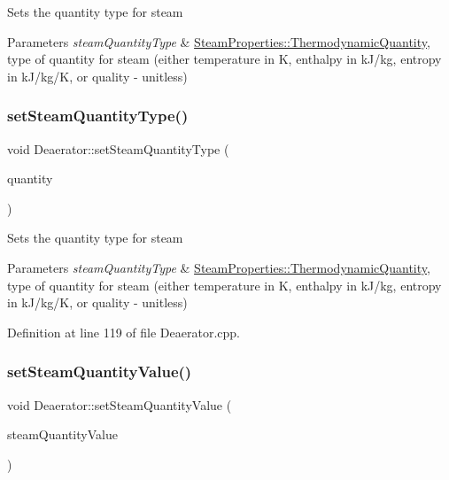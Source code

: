 Sets the quantity type for steam 
\begin{DoxyParams}{Parameters}
{\em steam\+Quantity\+Type} & \hyperlink{class_steam_properties_ae0294bedf7d178c2d8fb6aed0f62fbff}{Steam\+Properties\+::\+Thermodynamic\+Quantity}, type of quantity for steam (either temperature in K, enthalpy in k\+J/kg, entropy in k\+J/kg/K, or quality -\/ unitless) \\
\hline
\end{DoxyParams}
\mbox{\label{class_deaerator_a1aa3b3de064d148479af9576e717b6c2}} 
\subsubsection{\texorpdfstring{set\+Steam\+Quantity\+Type()}{setSteamQuantityType()}\hspace{0.1cm}{\footnotesize\ttfamily [3/3]}}
{\footnotesize\ttfamily void Deaerator\+::set\+Steam\+Quantity\+Type (\begin{DoxyParamCaption}\item[{\hyperlink{class_steam_properties_ae0294bedf7d178c2d8fb6aed0f62fbff}{Steam\+Properties\+::\+Thermodynamic\+Quantity}}]{quantity }\end{DoxyParamCaption})}

Sets the quantity type for steam 
\begin{DoxyParams}{Parameters}
{\em steam\+Quantity\+Type} & \hyperlink{class_steam_properties_ae0294bedf7d178c2d8fb6aed0f62fbff}{Steam\+Properties\+::\+Thermodynamic\+Quantity}, type of quantity for steam (either temperature in K, enthalpy in k\+J/kg, entropy in k\+J/kg/K, or quality -\/ unitless) \\
\hline
\end{DoxyParams}


Definition at line 119 of file Deaerator.\+cpp.

\mbox{\label{class_deaerator_a101399a8b66c3ff1fecf884fd1b1373d}} 
\subsubsection{\texorpdfstring{set\+Steam\+Quantity\+Value()}{setSteamQuantityValue()}\hspace{0.1cm}{\footnotesize\ttfamily [1/3]}}
{\footnotesize\ttfamily void Deaerator\+::set\+Steam\+Quantity\+Value (\begin{DoxyParamCaption}\item[{double}]{steam\+Quantity\+Value }\end{DoxyParamCaption})}

